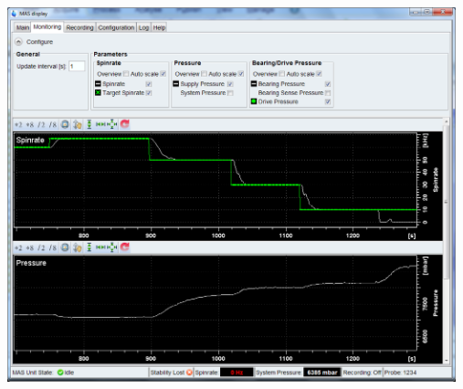 \documentclass[a4paper]{article}
\newenvironment{Figure}
	{\par\medskip\noindent\minipage{\linewidth}}
	{\endminipage\par\medskip}
\begin{document}
	\begin{Figure}
		\centering
		\includegraphics[width=13cm]{images/gruppe1_ab.png}
		\label{fig:topspin_down}
	\end{Figure}

	\pagebreak
	
\end{document}
